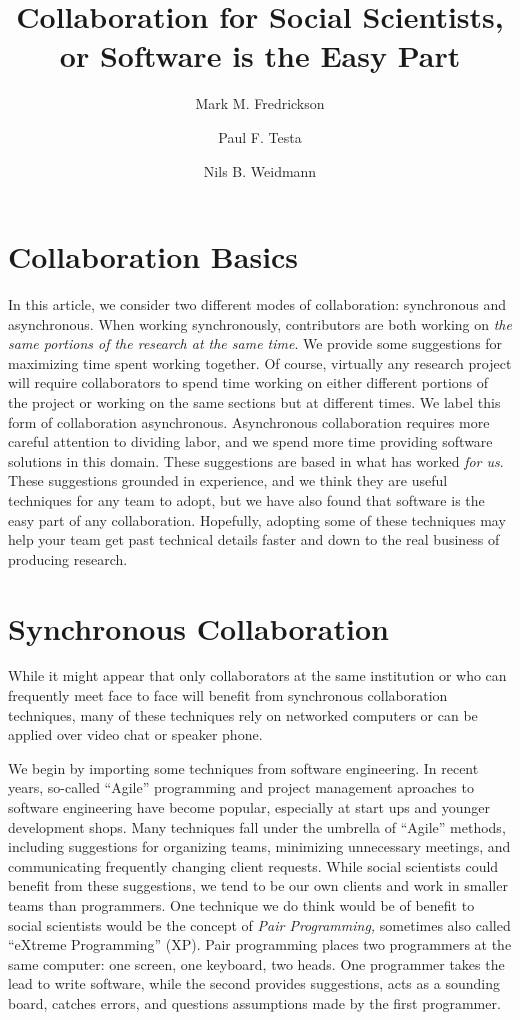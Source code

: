\documentclass[]{article}
\author{Mark M. Fredrickson \and Paul F. Testa \and Nils B. Weidmann} %
\title{Collaboration for Social Scientists, or Software is the Easy Part}
\begin{document}
\maketitle
\section{Collaboration Basics}


In this article, we consider two different modes of collaboration: synchronous
and asynchronous. When working synchronously, contributors are both working on
\emph{the same portions of the research at the same time}. We provide some
suggestions for maximizing time spent working together. Of course, virtually
any research project will require collaborators to spend time working on
either different portions of the project or working on the same sections but
at different times. We label this form of collaboration asynchronous.
Asynchronous collaboration requires more careful attention to dividing labor,
and we spend more time providing software solutions in this domain. These
suggestions are based in what has worked \emph{for us}. These suggestions
grounded in experience, and we think they are
useful techniques for any team to adopt, but we have also found that software
is the easy part of any collaboration. Hopefully, adopting some of these
techniques may help your team get past technical details faster and down to
the real business of producing research.

\section{Synchronous Collaboration}

While it might appear that only collaborators at the same institution or who can
frequently meet face to face will benefit from synchronous collaboration
techniques, many of these techniques rely on networked computers or can be
applied over video chat or speaker phone.

We begin by importing some techniques from software engineering. In recent
years, so-called ``Agile'' programming and project management aproaches to
software engineering have become popular, especially at start ups and younger
development shops. Many techniques fall under the umbrella of ``Agile''
methods, including suggestions for organizing teams, minimizing unnecessary
meetings, and communicating frequently changing client requests. While social
scientists could benefit from these suggestions, we tend to be our own clients
and work in smaller teams than programmers. One technique we do think would be
of benefit to social scientists would be the concept of \emph{Pair
Programming,} sometimes also called ``eXtreme Programming'' (XP). Pair
programming places two programmers at the same computer: one screen, one
keyboard, two heads. One programmer takes the lead to write software, while
the second provides suggestions, acts as a sounding board, catches errors, and
questions assumptions made by the first programmer. 
\end{document}
